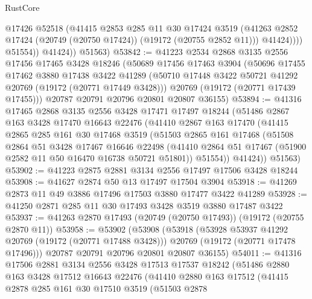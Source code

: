 \begin{lexlean}{RustCore}
\begin{coremodule}
                    @17426
                    @52518
                    (@41415
                      @2853
                      @285
                      @11
                      @30
                      @17424
                      @3519
                      (@41263 @2852 @17424 (@20749 (@20750 @17424)) (@19172 (@20755 @2852 @11)))
                      @41424))))
              @51554))
          @41424))
      @51563)
@53842 := @41223
    @2534
    @2868
    @3135
    @2556
    @17456
    @17465
    @3428
    @18246
    (@50689
      @17456
      @17463
      @3904
      (@50696
        @17455
        @17462
        @3880
        @17438
        @3422
        @41289
        (@50710 @17448 @3422 @50721 @41292 @20769 (@19172 (@20771 @17449 @3428)))
        @20769
        (@19172 (@20771 @17439 @17455)))
      @20787
      @20791
      @20796
      @20801
      @20807
      @36155)
@53894 := @41316
    @17465
    @2868
    @3135
    @2556
    @3428
    @17471
    @17497
    @18244
    (@51486
      @2867
      @163
      @3428
      @17470
      @16643
      @22476
      (@41410
        @2867
        @163
        @17470
        (@41415
          @2865
          @285
          @161
          @30
          @17468
          @3519
          (@51503
            @2865
            @161
            @17468
            (@51508
              @2864
              @51
              @3428
              @17467
              @16646
              @22498
              (@41410 @2864 @51 @17467 (@51900 @2582 @11 @50 @16470 @16738 @50721 @51801))
              @51554))
          @41424))
      @51563)
@53902 := @41223 @2875 @2881 @3134 @2556 @17497 @17506 @3428 @18244
@53908 := @41627 @2874 @50 @13 @17497 @17504 @3904
@53918 := @41269 @2873 @11 @49 @3886 @17496 @17503 @3880 @17477 @3422 @41289
@53928 := @41250 @2871 @285 @11 @30 @17493 @3428 @3519 @3880 @17487 @3422
@53937 := @41263 @2870 @17493 (@20749 (@20750 @17493)) (@19172 (@20755 @2870 @11))
@53958 := @53902
    (@53908
      (@53918
        (@53928 @53937 @41292 @20769 (@19172 (@20771 @17488 @3428)))
        @20769
        (@19172 (@20771 @17478 @17496)))
      @20787
      @20791
      @20796
      @20801
      @20807
      @36155)
@54011 := @41316
    @17506
    @2881
    @3134
    @2556
    @3428
    @17513
    @17537
    @18242
    (@51486
      @2880
      @163
      @3428
      @17512
      @16643
      @22476
      (@41410
        @2880
        @163
        @17512
        (@41415
          @2878
          @285
          @161
          @30
          @17510
          @3519
          (@51503
            @2878

\end{coremodule}
\end{lexlean}
